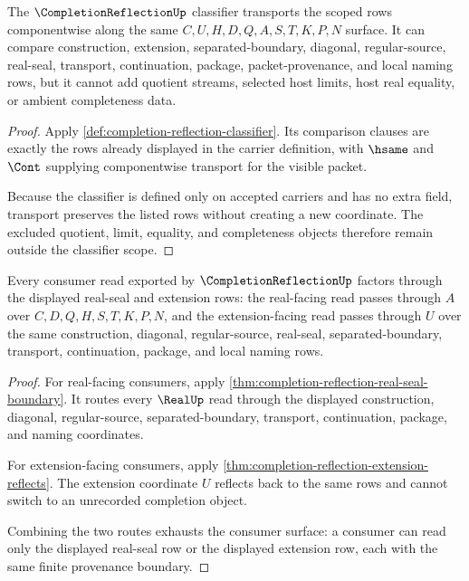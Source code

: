 \begin{theorem}
\label{thm:completionreflection-classifier-scope}
The $\CompletionReflectionUp$ classifier transports the scoped rows componentwise along the same $C,U,H,D,Q,A,S,T,K,P,N$ surface. It can compare construction, extension, separated-boundary, diagonal, regular-source, real-seal, transport, continuation, package, packet-provenance, and local naming rows, but it cannot add quotient streams, selected host limits, host real equality, or ambient completeness data.
\end{theorem}
\begin{proof}
Apply \autoref{def:completion-reflection-classifier}. Its comparison clauses are exactly the rows already displayed in the carrier definition, with $\hsame$ and $\Cont$ supplying componentwise transport for the visible packet.

Because the classifier is defined only on accepted carriers and has no extra field, transport preserves the listed rows without creating a new coordinate. The excluded quotient, limit, equality, and completeness objects therefore remain outside the classifier scope.
\end{proof}

\begin{theorem}
\label{thm:completionreflection-consumer-scope}
Every consumer read exported by $\CompletionReflectionUp$ factors through the displayed real-seal and extension rows: the real-facing read passes through $A$ over $C,D,Q,H,S,T,K,P,N$, and the extension-facing read passes through $U$ over the same construction, diagonal, regular-source, real-seal, separated-boundary, transport, continuation, package, and local naming rows.
\end{theorem}
\begin{proof}
For real-facing consumers, apply \autoref{thm:completion-reflection-real-seal-boundary}. It routes every $\RealUp$ read through the displayed construction, diagonal, regular-source, separated-boundary, transport, continuation, package, and naming coordinates.

For extension-facing consumers, apply \autoref{thm:completion-reflection-extension-reflects}. The extension coordinate $U$ reflects back to the same rows and cannot switch to an unrecorded completion object.

Combining the two routes exhausts the consumer surface: a consumer can read only the displayed real-seal row or the displayed extension row, each with the same finite provenance boundary.
\end{proof}

